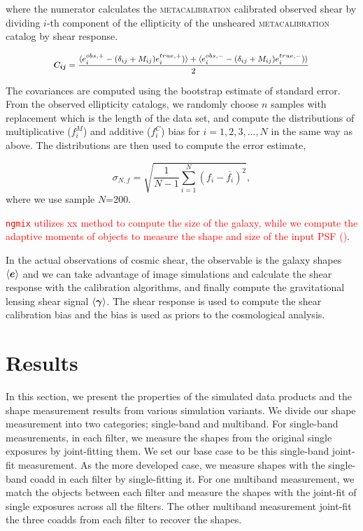 {where the numerator calculates the \textsc{metacalibration} calibrated observed shear by dividing $i$-th component of the ellipticity of the unsheared \textsc{metacalibration} catalog by shear response.


\begin{equation}
    \small
    \vb*{C_{ij}} = \frac{\langle e^{obs,+}_{i} - (\delta_{ij}+M_{ij})e^{true,+}_{i})\rangle + \langle e^{obs,-}_{i} - (\delta_{ij}+M_{ij})e^{true,-}_{i}) \rangle}{2}
\end{equation}


The covariances are computed using the bootstrap estimate of standard error. From the observed ellipticity catalogs, we randomly choose $n$ samples with replacement which is the length of the data set, and compute the distributions of multiplicative ($f^{M}_{i}$) and additive ($f^{C}_{i}$) bias for $i=1,2,3,...,N$ in the same way as above. The distributions are then used to compute the error estimate,  


\begin{equation}
    \sigma_{N,f} = \sqrt{\frac{1}{N-1} \sum_{i=1}^{N}(f_{i}-\bar{f_{i}})^{2}}, 
\end{equation}
where we use sample $N$=200. 

\textcolor{red}{\texttt{ngmix} utilizes xx method to compute the size of the galaxy, while we compute the adaptive moments of objects to measure the shape and size of the input PSF (\citealt{2003MNRAS.343..459H})}. 

In the actual observations of cosmic shear, the observable is the galaxy shapes $\langle\vb*{e}\rangle$ and we can take advantage of image simulations and calculate the shear response with the calibration algorithms, and finally compute the gravitational lensing shear signal $\langle\vb*{\gamma}\rangle$. The shear response is used to compute the shear calibration bias and the bias is used as priors to the cosmological analysis. 


\section{Results}
\label{sec:results}
In this section, we present the properties of the simulated data products and the shape measurement results from various simulation variants. We divide our shape measurement into two categories; single-band and multiband. For single-band measurements, in each filter, we measure the shapes from the original single exposures by joint-fitting them. We set our base case to be this single-band joint-fit measurement. As the more developed case, we measure shapes with the single-band coadd in each filter by single-fitting it. For one multiband measurement, we match the objects between each filter and measure the shapes with the joint-fit of single exposures across all the filters. The other multiband measurement joint-fit the three coadds from each filter to recover the shapes. 

}
